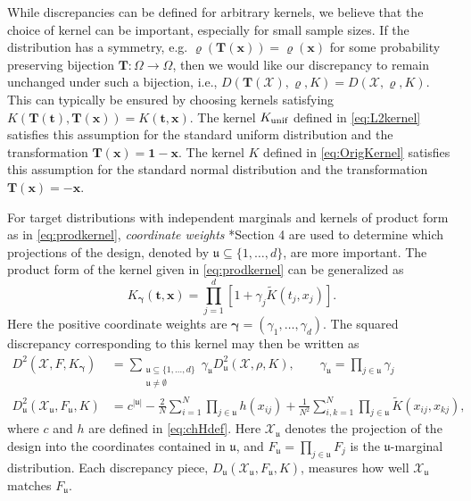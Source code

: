 \documentclass[graybox]{svmult}
\newcommand{\vx}{\boldsymbol{x}}
\newcommand{\vt}{\boldsymbol{t}}
\newcommand{\fraku}{\mathfrak{u}}
\newcommand{\Xdes}{\mathcal{X}}
\newcommand{\unif}{\textup{unif}}
\newcommand{\tK}{\widetilde{K}}
\newcommand{\vT}{\boldsymbol{T}}
\newcommand{\vone}{\boldsymbol{1}}
\newcommand{\vgamma}{\boldsymbol{\gamma}}
\def\abs#1{\ensuremath{\left \lvert #1 \right \rvert}}
\begin{document}
While discrepancies can be defined for arbitrary kernels, we believe that the choice of kernel can be important, especially for small sample sizes.  If the distribution has a symmetry, e.g. $\varrho(\vT(\vx)) = \varrho(\vx)$ for some probability preserving bijection $\vT:\Omega \to \Omega$, then we would like our discrepancy to remain unchanged under such a bijection, i.e., $D(\vT(\Xdes),\varrho,K) = D(\Xdes,\varrho,K)$.  This can typically be ensured by choosing kernels satisfying $K(\vT(\vt),\vT(\vx)) = K(\vt,\vx)$.   The kernel $K_\unif$ defined in \eqref{eq:L2kernel} satisfies this assumption for the standard uniform distribution and the transformation $\vT(\vx) = \vone - \vx$.  The kernel $K$ defined in \eqref{eq:OrigKernel} satisfies this assumption for the standard normal distribution and the transformation $\vT(\vx) = -\vx$.

For target distributions with independent marginals and kernels of product form as in \eqref{eq:prodkernel}, \emph{coordinate weights} \cite{DicEtal14a}*{Section 4} are used to determine which projections of the design, denoted by $\fraku \subseteq \{1, \ldots, d\}$, are more important.  The product form of the kernel given in \eqref{eq:prodkernel} can be generalized as 
\begin{equation*} %
     K_{\vgamma}(\vt,\vx)  = \prod_{j=1}^d\left[1+ \gamma_j \tK(t_j,x_j) \right].
\end{equation*}
Here the positive coordinate weights are $\vgamma = (\gamma_1, \ldots, \gamma_d)$.
The squared discrepancy corresponding to this kernel may then be written as
\begin{align*}
      D^2(\Xdes,F,K_{\vgamma}) &= \sum_{\substack{\fraku \subseteq \{1, \ldots, d\} \\ \fraku \ne \emptyset}}\gamma_\fraku D^2_{\fraku} (\Xdes,\rho,K), \qquad \gamma_{\fraku} = \prod_{j \in \fraku} \gamma_j\\
    D^2_{\fraku} (\Xdes_\fraku,F_\fraku,K) & = c^{\abs{\fraku}} - \frac 2N \sum_{i=1}^N \prod_{j \in \fraku} h(x_{ij}) + \frac{1}{N^2} \sum_{i,k=1}^N \prod_{j \in \fraku} \tK(x_{ij},x_{kj}),
\end{align*}
where $c$ and $h$ are defined in \eqref{eq:chHdef}. Here $\Xdes_\fraku$ denotes the projection of the design into the coordinates contained in $\fraku$, and $F_\fraku = \prod_{j \in \fraku} F_j$ is the $\fraku$-marginal distribution.  Each discrepancy piece, $D_{\fraku} (\Xdes_\fraku,F_\fraku,K)$, measures how well $\Xdes_\fraku$ matches $F_\fraku$. 
\end{document}
